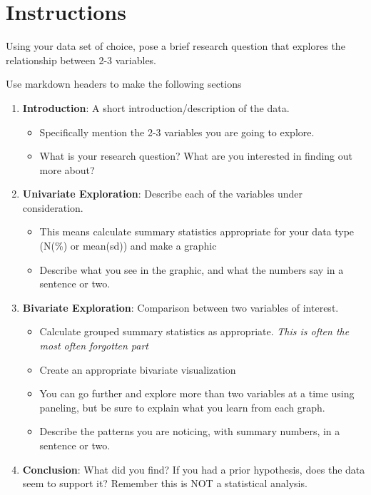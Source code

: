 \documentclass[
  letterpaper,
  DIV=11,
  numbers=noendperiod,
  oneside]{scrreprt}
\providecommand{\tightlist}{%
  \setlength{\itemsep}{0pt}\setlength{\parskip}{0pt}}\usepackage{longtable,booktabs,array}
\begin{document}
\chapter*{Instructions}\label{instructions}


Using your data set of choice, pose a brief research question that
explores the relationship between 2-3 variables.

Use markdown headers to make the following sections

\begin{enumerate}
\def\labelenumi{\arabic{enumi}.}
\tightlist
\item
  \textbf{Introduction}: A short introduction/description of the data.

  \begin{itemize}
  \tightlist
  \item
    Specifically mention the 2-3 variables you are going to explore.
  \item
    What is your research question? What are you interested in finding
    out more about?
  \end{itemize}
\item
  \textbf{Univariate Exploration}: Describe each of the variables under
  consideration.

  \begin{itemize}
  \tightlist
  \item
    This means calculate summary statistics appropriate for your data
    type (N(\%) or mean(sd)) and make a graphic
  \item
    Describe what you see in the graphic, and what the numbers say in a
    sentence or two.
  \end{itemize}
\item
  \textbf{Bivariate Exploration}: Comparison between two variables of
  interest.

  \begin{itemize}
  \tightlist
  \item
    Calculate grouped summary statistics as appropriate. \emph{This is
    often the most often forgotten part}
  \item
    Create an appropriate bivariate visualization
  \item
    You can go further and explore more than two variables at a time
    using paneling, but be sure to explain what you learn from each
    graph.
  \item
    Describe the patterns you are noticing, with summary numbers, in a
    sentence or two.
  \end{itemize}
\item
  \textbf{Conclusion}: What did you find? If you had a prior hypothesis,
  does the data seem to support it? Remember this is NOT a statistical
  analysis.
\end{enumerate}
\end{document}
